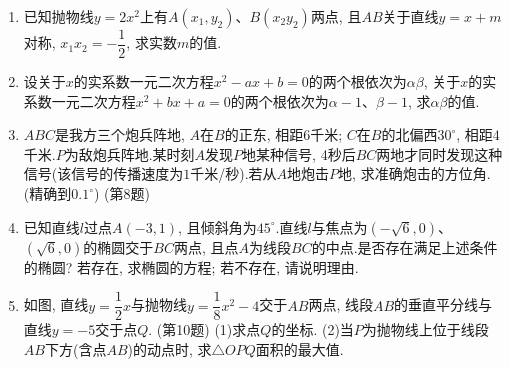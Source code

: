 \documentclass[10pt,a4paper]{article}
\begin{document}
\begin{enumerate}[1.]
\item 已知抛物线$y=2x^2$上有$A(x_1,y_2)$、$B(x_2y_2)$两点, 且$AB$关于直线$y=x+m$对称, $x_1x_2=-\dfrac 12$, 求实数$m$的值.
\item 设关于$x$的实系数一元二次方程$x^2-ax+b=0$的两个根依次为$\alpha \beta$, 关于$x$的实系数一元二次方程$x^2+bx+a=0$的两个根依次为$\alpha -1$、$\beta -1$, 求$\alpha \beta$的值.
\item $ABC$是我方三个炮兵阵地, $A$在$B$的正东, 相距$6$千米; $C$在$B$的北偏西$30^{\circ }$, 相距$4$千米.$P$为敌炮兵阵地.某时刻$A$发现$P$地某种信号, 4秒后$BC$两地才同时发现这种信号(该信号的传播速度为$1$千米/秒).若从$A$地炮击$P$地, 求准确炮击的方位角.(精确到$0.1^{\circ }$)
(第8题)
\item 已知直线$l$过点$A(-3,1)$, 且倾斜角为$45^{\circ }$.直线$l$与焦点为$(-\sqrt 6,0)$、$(\sqrt 6,0)$的椭圆交于$BC$两点, 且点$A$为线段$BC$的中点.是否存在满足上述条件的椭圆? 若存在, 求椭圆的方程; 若不存在, 请说明理由.
\item 如图, 直线$y=\dfrac 12x$与抛物线$y=\dfrac 18x^2-4$交于$AB$两点, 线段$AB$的垂直平分线与直线$y=-5$交于点$Q$.
(第10题)
(1)求点$Q$的坐标.
(2)当$P$为抛物线上位于线段$AB$下方(含点$AB$)的动点时, 求$\triangle OPQ$面积的最大值.





\end{enumerate}
\end{document}
